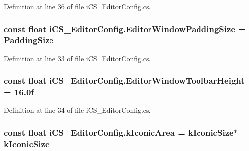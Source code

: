 Definition at line 36 of file i\+C\+S\+\_\+\+Editor\+Config.\+cs.

\hypertarget{classi_c_s___editor_config_a5acf6d9a9b1ac2e174f64cfd3ae4927a}{
\subsubsection[{Editor\+Window\+Padding\+Size}]{\setlength{\rightskip}{0pt plus 5cm}const float i\+C\+S\+\_\+\+Editor\+Config.\+Editor\+Window\+Padding\+Size = {\bf Padding\+Size}}}\label{classi_c_s___editor_config_a5acf6d9a9b1ac2e174f64cfd3ae4927a}


Definition at line 33 of file i\+C\+S\+\_\+\+Editor\+Config.\+cs.

\hypertarget{classi_c_s___editor_config_a574d81bc08ad93a815475c18ec557ba4}{
\subsubsection[{Editor\+Window\+Toolbar\+Height}]{\setlength{\rightskip}{0pt plus 5cm}const float i\+C\+S\+\_\+\+Editor\+Config.\+Editor\+Window\+Toolbar\+Height = 16.\+0f}}\label{classi_c_s___editor_config_a574d81bc08ad93a815475c18ec557ba4}


Definition at line 34 of file i\+C\+S\+\_\+\+Editor\+Config.\+cs.

\hypertarget{classi_c_s___editor_config_a9e36d360c442eaf24a66cf6473f11204}{
\subsubsection[{k\+Iconic\+Area}]{\setlength{\rightskip}{0pt plus 5cm}const float i\+C\+S\+\_\+\+Editor\+Config.\+k\+Iconic\+Area = {\bf k\+Iconic\+Size}$\ast${\bf k\+Iconic\+Size}}}\label{classi_c_s___editor_config_a9e36d360c442eaf24a66cf6473f11204}


